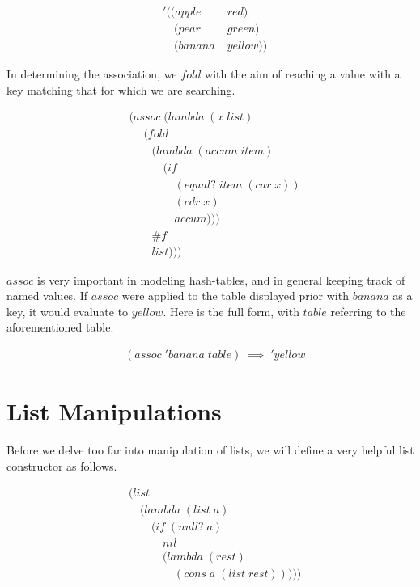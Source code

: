 \begin{figure}[htp]
\caption{}\label{fig:hashExample}
\begin{align*}
& '((apple \; &red)
\\& \quad (pear \; &green)
\\& \quad (banana \; &yellow))
\end{align*}
\end{figure}

In determining the association, we $fold$ with the aim of reaching a value with a 
key matching that for which we are searching.

\begin{figure}[htp]
\caption{}\label{fig:assocDef}
\begin{align*}
& (assoc \; (lambda \; (x \; list)
\\& \quad \; (fold \; 
\\& \qquad (lambda \; (accum \; item) \; 
\\& \qquad \quad (if \; 
\\& \qquad \qquad (equal? \; item \; (car \; x))
\\& \qquad \qquad (cdr \; x)
\\& \qquad \qquad accum)))
\\& \qquad \#f
\\& \qquad list)))
\end{align*}
\end{figure}

$assoc$ is very important in modeling hash-tables, and in general keeping track of 
named values. If $assoc$ were applied to the table displayed prior with $banana$ 
as a key, it would evaluate to $yellow$. Here is the full form, with $table$ 
referring to the aforementioned table.

\begin{figure}[htp]
\caption{}\label{fig:assocExample}
\begin{align*}
& (assoc \; 'banana \; table) \; \implies \; 'yellow
\end{align*}
\end{figure}

\section{List Manipulations}
Before we delve too far into manipulation of lists, we will define a very helpful 
list constructor as follows.

\begin{figure}[htp]
\caption{}\label{fig:listDef}
\begin{align*}
& (list \; 
\\& \quad (lambda \; (list \; a) \; 
\\& \qquad (if \; (null? \; a)
\\& \qquad \quad nil
\\& \qquad \quad (lambda \; (rest)
\\& \qquad \qquad (cons \; a \; (list \; rest)))))
\end{align*}
\end{figure}

